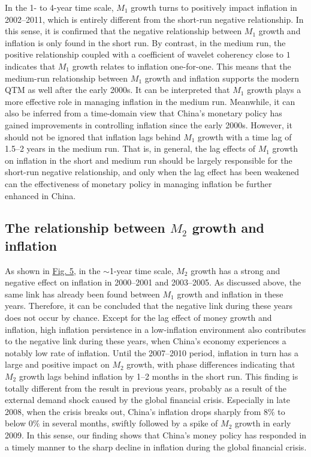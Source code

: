 \documentclass[a4paper,fleqn]{cas-sc}
\begin{document}
In the 1- to 4-year time scale, $M_1$ growth turns to positively impact inflation in 2002–2011, which is entirely different from the short-run negative relationship. In this sense, it is confirmed that the negative relationship between $M_1$ growth and inflation is only found in the short run. By contrast, in the medium run, the positive relationship coupled with a coefficient of wavelet coherency close to $1$ indicates that $M_1$ growth relates to inflation one-for-one. This means that the medium-run relationship between $M_1$ growth and inflation supports the modern QTM as well after the early 2000s. It can be interpreted that $M_1$ growth plays a more effective role in managing inflation in the medium run. Meanwhile, it can also be inferred from a time-domain view that China's monetary policy has gained improvements in controlling inflation since the early 2000s. However, it should not be ignored that inflation lags behind $M_1$ growth with a time lag of 1.5–2 years in the medium run. That is, in general, the lag effects of $M_1$ growth on inflation in the short and medium run should be largely responsible for the short-run negative relationship, and only when the lag effect has been weakened can the effectiveness of monetary policy in managing inflation be further enhanced in China.

\subsection{The relationship between \boldmath $M_2$ growth and inflation}
As shown in \hyperref[fig:5]{Fig. 5}, in the $\sim$1-year time scale, $M_2$ growth has a strong and negative effect on inflation in 2000–2001 and 2003–2005. As discussed above, the same link has already been found between $M_1$ growth and inflation in these years. Therefore, it can be concluded that the negative link during these years does not occur by chance. Except for the lag effect of money growth and inflation, high inflation persistence in a low-inflation environment also contributes to the negative link during these years, when China's economy experiences a notably low rate of inflation. Until the 2007–2010 period, inflation in turn has a large and positive impact on $M_2$ growth, with phase differences indicating that $M_2$ growth lags behind inflation by 1–2 months in the short run. This finding is totally different from the result in previous years, probably as a result of the external demand shock caused by the global financial crisis. Especially in late 2008, when the crisis breaks out, China's inflation drops sharply from $8\%$ to below $0\%$ in several months, swiftly followed by a spike of $M_2$ growth in early 2009. In this sense, our finding shows that China's money policy has responded in a timely manner to the sharp decline in inflation during the global financial crisis.
\end{document}
